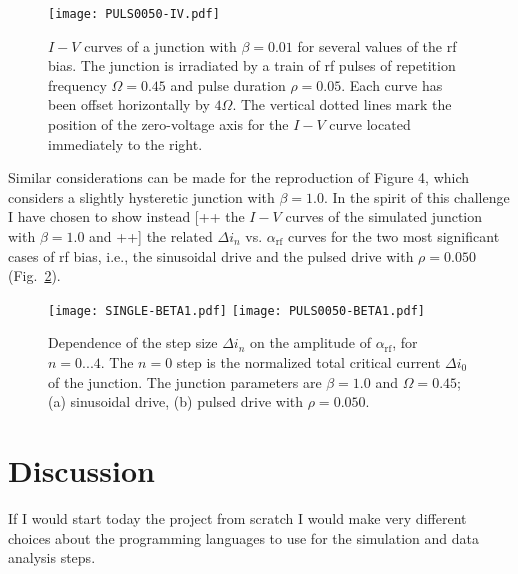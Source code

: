 \begin{figure}[tbh]
	\centering
	\texttt{[image: PULS0050-IV.pdf]}
	\caption{$I - V$ curves of a junction with $\beta = 0.01$ for several values of the rf bias. The junction is  irradiated by a train of rf pulses of repetition frequency $\Omega = 0.45$ and pulse duration $\rho = 0.05$. Each curve has been offset horizontally by $4 \Omega$. The vertical dotted lines mark the position of the zero-voltage axis for the $I - V$ curve located immediately to the right.}
	\label{fig:pulsed-ivs}
\end{figure}


Similar considerations can be made for the reproduction of Figure 4, which considers a slightly hysteretic junction with $\beta = 1.0$. In the spirit of this challenge I have chosen to show instead [++ the $I - V$ curves of the simulated junction with $\beta = 1.0$ and ++] the related $\Delta i_n$ vs. $\alpha_\mathrm{rf}$ curves for the two most significant cases of rf bias, i.e., the sinusoidal drive and the pulsed drive with $\rho = 0.050$ (Fig.~\ref{fig:step-width-beta1}).

\begin{figure}[tbh]
	\centering
	\texttt{[image: SINGLE-BETA1.pdf]}
	\texttt{[image: PULS0050-BETA1.pdf]}
	\caption{Dependence of the step size $\Delta i_n$ on the amplitude of  $\alpha_\mathrm{rf}$, for $n = 0. . . 4$. The $n = 0$ step is the normalized total critical current $\Delta i_0$ of the junction. The junction parameters are $\beta = 1.0$ and $\Omega = 0. 45$; (a) sinusoidal drive, (b) pulsed drive with $\rho = 0. 050$.}
	\label{fig:step-width-beta1}
\end{figure}



\section{Discussion}

If I would start today the project from scratch I would make very different choices about the programming languages to use for the simulation and data analysis steps.

